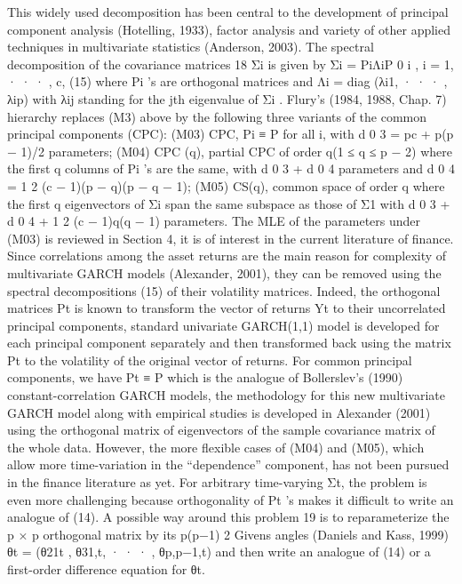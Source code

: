 This widely used decomposition has been central to the development of principal component
analysis (Hotelling, 1933), factor analysis and variety of other applied techniques in multivariate
statistics (Anderson, 2003). The spectral decomposition of the covariance matrices
18
{Σi} is given by
Σi = PiΛiP
0
i
, i = 1, · · · , c, (15)
where Pi
’s are orthogonal matrices and Λi = diag (λi1, · · · , λip) with λij standing for the
jth eigenvalue of Σi
. Flury’s (1984, 1988, Chap. 7) hierarchy replaces (M3) above by the
following three variants of the common principal components (CPC):
(M03) CPC, Pi ≡ P for all i, with d
0
3 = pc + p(p − 1)/2 parameters;
(M04) CPC (q), partial CPC of order q(1 ≤ q ≤ p − 2) where the first q columns of Pi
’s
are the same, with d
0
3 + d
0
4 parameters and d
0
4 =
1
2
(c − 1)(p − q)(p − q − 1);
(M05) CS(q), common space of order q where the first q eigenvectors of Σi span the same
subspace as those of Σ1 with d
0
3 + d
0
4 +
1
2
(c − 1)q(q − 1) parameters.
The MLE of the parameters under (M03) is reviewed in Section 4, it is of interest in the current literature of finance. Since correlations among the asset returns are the main reason
for complexity of multivariate GARCH models (Alexander, 2001), they can be removed using the spectral decompositions (15) of their volatility matrices. Indeed, the orthogonal
matrices Pt is known to transform the vector of returns Yt to their uncorrelated principal components, standard univariate GARCH(1,1) model is developed for each principal component
separately and then transformed back using the matrix Pt to the volatility of the original vector of returns. For common principal components, we have Pt ≡ P which is the analogue
of Bollerslev’s (1990) constant-correlation GARCH models, the methodology for this new multivariate GARCH model along with empirical studies is developed in Alexander (2001)
using the orthogonal matrix of eigenvectors of the sample covariance matrix of the whole data. However, the more flexible cases of (M04) and (M05), which allow more time-variation
in the “dependence” component, has not been pursued in the finance literature as yet. For arbitrary time-varying {Σt}, the problem is even more challenging because orthogonality of
Pt ’s makes it difficult to write an analogue of (14). A possible way around this problem
19
is to reparameterize the p × p orthogonal matrix by its p(p−1)
2 Givens angles (Daniels and
Kass, 1999) θt = (θ21t
, θ31,t, · · · , θp,p−1,t) and then write an analogue of (14) or a first-order
difference equation for {θt}.

